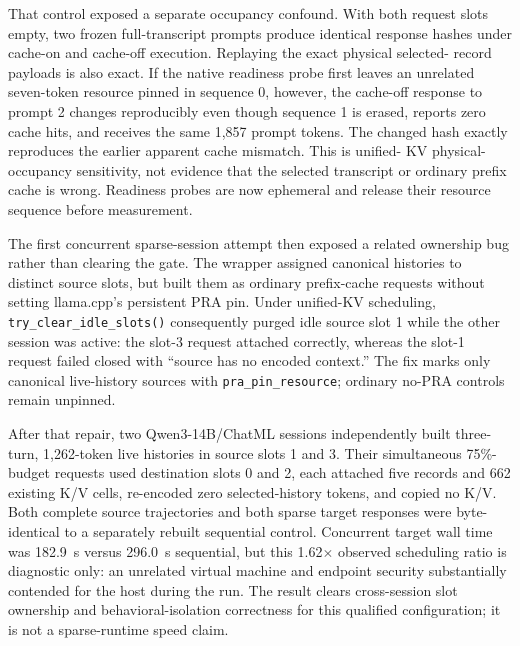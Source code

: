 \documentclass[11pt]{article}
\begin{document}
That control exposed a separate occupancy confound.  With both request slots
empty, two frozen full-transcript prompts produce identical response hashes
under cache-on and cache-off execution.  Replaying the exact physical selected-
record payloads is also exact.  If the native readiness probe first leaves an
unrelated seven-token resource pinned in sequence 0, however, the cache-off
response to prompt 2 changes reproducibly even though sequence 1 is erased,
reports zero cache hits, and receives the same 1,857 prompt tokens.  The changed
hash exactly reproduces the earlier apparent cache mismatch.  This is unified-
KV physical-occupancy sensitivity, not evidence that the selected transcript
or ordinary prefix cache is wrong.  Readiness probes are now ephemeral and
release their resource sequence before measurement.

The first concurrent sparse-session attempt then exposed a related ownership
bug rather than clearing the gate.  The wrapper assigned canonical histories to
distinct source slots, but built them as ordinary prefix-cache requests without
setting llama.cpp's persistent PRA pin.  Under unified-KV scheduling,
\texttt{try\_clear\_idle\_slots()} consequently purged idle source slot 1 while
the other session was active: the slot-3 request attached correctly, whereas
the slot-1 request failed closed with ``source has no encoded context.''  The
fix marks only canonical live-history sources with
\texttt{pra\_pin\_resource}; ordinary no-PRA controls remain unpinned.

After that repair, two Qwen3-14B/ChatML sessions independently built three-turn,
1,262-token live histories in source slots 1 and 3.  Their simultaneous
75\%-budget requests used destination slots 0 and 2, each attached five records and
662 existing K/V cells, re-encoded zero selected-history tokens, and copied no
K/V.  Both complete source trajectories and both sparse target responses were
byte-identical to a separately rebuilt sequential control.  Concurrent target
wall time was 182.9~s versus 296.0~s sequential, but this 1.62$\times$ observed
scheduling ratio is diagnostic only: an unrelated virtual machine and endpoint
security substantially contended for the host during the run.  The result
clears cross-session slot ownership and behavioral-isolation correctness for
this qualified configuration; it is not a sparse-runtime speed claim.
\end{document}
